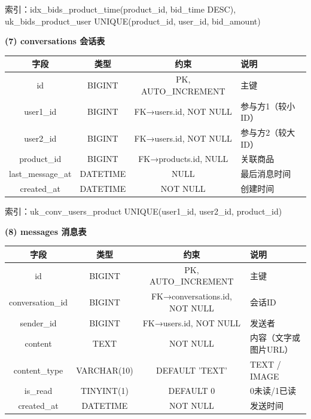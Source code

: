 \documentclass[12pt,a4paper]{ctexart}
\numberwithin{figure}{section}
\numberwithin{table}{section}
\begin{document}
索引：idx\_bids\_product\_time(product\_id, bid\_time DESC), uk\_bids\_product\_user UNIQUE(product\_id, user\_id, bid\_amount)

\textbf{(7) conversations 会话表}

\begin{center}
\renewcommand{\arraystretch}{1.3}
\small
\begin{tabular}{|c|c|c|p{5cm}|}
\hline
\rowcolor{tableheader}
\textbf{字段} & \textbf{类型} & \textbf{约束} & \textbf{说明} \\
\hline
id & BIGINT & PK, AUTO\_INCREMENT & 主键 \\
\hline
user1\_id & BIGINT & FK→users.id, NOT NULL & 参与方1（较小ID） \\
\hline
user2\_id & BIGINT & FK→users.id, NOT NULL & 参与方2（较大ID） \\
\hline
product\_id & BIGINT & FK→products.id, NULL & 关联商品 \\
\hline
last\_message\_at & DATETIME & NULL & 最后消息时间 \\
\hline
created\_at & DATETIME & NOT NULL & 创建时间 \\
\hline
\end{tabular}
\end{center}

索引：uk\_conv\_users\_product UNIQUE(user1\_id, user2\_id, product\_id)

\textbf{(8) messages 消息表}

\begin{center}
\renewcommand{\arraystretch}{1.3}
\small
\begin{tabular}{|c|c|c|p{5cm}|}
\hline
\rowcolor{tableheader}
\textbf{字段} & \textbf{类型} & \textbf{约束} & \textbf{说明} \\
\hline
id & BIGINT & PK, AUTO\_INCREMENT & 主键 \\
\hline
conversation\_id & BIGINT & FK→conversations.id, NOT NULL & 会话ID \\
\hline
sender\_id & BIGINT & FK→users.id, NOT NULL & 发送者 \\
\hline
content & TEXT & NOT NULL & 内容（文字或图片URL） \\
\hline
content\_type & VARCHAR(10) & DEFAULT 'TEXT' & TEXT / IMAGE \\
\hline
is\_read & TINYINT(1) & DEFAULT 0 & 0未读/1已读 \\
\hline
created\_at & DATETIME & NOT NULL & 发送时间 \\
\hline
\end{tabular}
\end{center}
\end{document}
